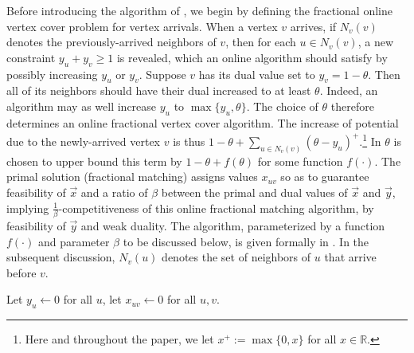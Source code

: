 Before introducing the algorithm of \cite{wang2015two}, we begin by defining the fractional online vertex cover problem for vertex arrivals. 
When a vertex $v$ arrives, if $N_v(v)$ denotes the previously-arrived neighbors of $v$, then for each $u\in N_v(v)$, a new constraint $y_u+y_v\geq 1$ is revealed, which an online algorithm should satisfy by possibly increasing $y_u$ or $y_v$.
Suppose $v$ has its dual value set to $y_v = 1-\theta$. Then all of its neighbors should have their dual increased to at least $\theta$. Indeed, an algorithm may as well increase $y_u$ to $\max\{y_u,\theta\}$. 
The choice of $\theta$ therefore determines an online fractional vertex cover algorithm. 
The increase of potential due to the newly-arrived vertex $v$ is thus $1-\theta + \sum_{u\in N_v(v)} (\theta-y_u)^+$.\footnote{Here and throughout the paper, we let $x^+ := \max\{0,x\}$ for all $x\in \mathbb{R}$.} In \cite{wang2015two} $\theta$ is chosen to upper bound this term by $1-\theta+f(\theta)$ for some function $f(\cdot)$. The primal solution (fractional matching) assigns values $x_{uv}$ so as to guarantee feasibility of $\vec{x}$ and a ratio of $\beta$ between the primal and dual values of $\vec{x}$ and $\vec{y}$, implying $\frac{1}{\beta}$-competitiveness of this online  fractional matching algorithm, by feasibility of $\vec{y}$ and weak duality. The algorithm, parameterized by a function $f(\cdot)$ and parameter $\beta$ to be discussed below, is given formally in . In the subsequent discussion, $N_v(u)$ denotes the set of neighbors of $u$ that arrive before $v$. 

\begin{algorithm}[h]
  \DontPrintSemicolon
  Let $y_u \gets 0$ for all $u$, let $x_{uv} \gets 0$ for all $u, v$. \;
    
    \caption{Online general vertex arrival fractional matching and vertex cover}
    \label{algo:TOBVC}
\end{algorithm}

